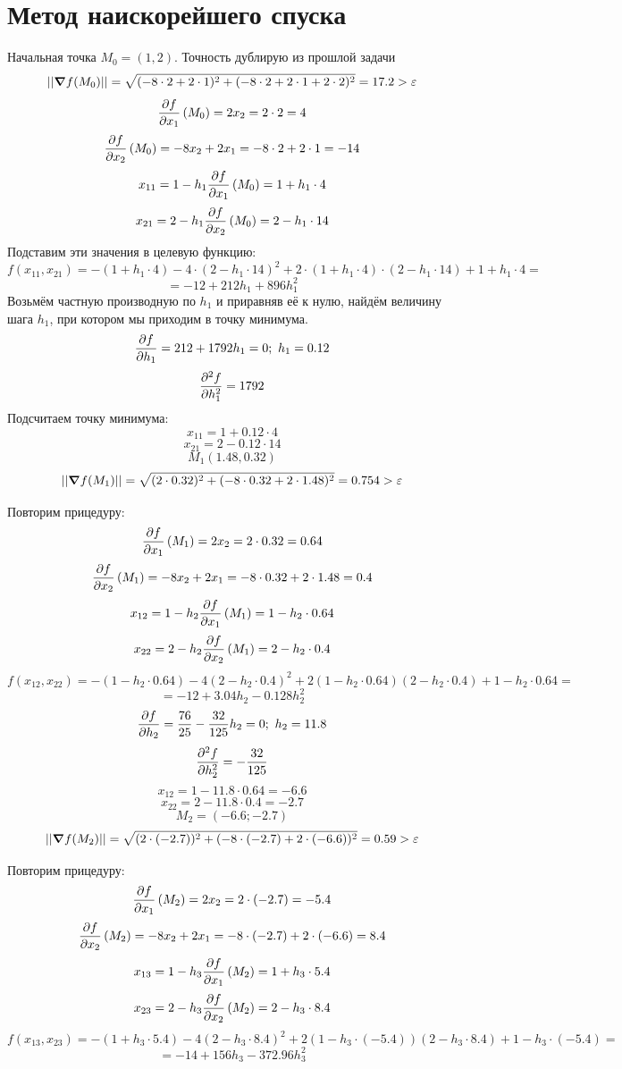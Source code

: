 \documentclass{article}
\begin{document}
\section*{Метод наискорейшего спуска}
Начальная точка $M_0 = (1, 2)$. Точность дублирую из прошлой задачи
\[||\grad f(M_0)|| = \sqrt{(-8\cdot 2+ 2\cdot 1)^2 + (-8\cdot 2+ 2\cdot 1 + 2\cdot 2)^2} = 17.2> \varepsilon\]
\[\pdv{f}{x_1} \left(M_0\right) = 2x_2 = 2\cdot 2 = 4\]
\[\pdv{f}{x_2} \left(M_0\right) = -8x_2+2x_1 = -8\cdot 2+ 2\cdot 1 = -14\]
\[x_{11} = 1 - h_1 \pdv{f}{x_1} \left(M_0\right) = 1 + h_1\cdot 4 \]
\[x_{21} = 2 - h_1 \pdv{f}{x_2} \left(M_0\right) = 2 - h_1\cdot 14 \]
Подставим эти значения в целевую функцию:
\[f(x_{11}, x_{21}) = -(1 + h_1\cdot 4) - 4\cdot (2 - h_1\cdot 14)^2 + 2\cdot (1 + h_1\cdot 4)\cdot (2 - h_1\cdot 14) +  1 + h_1\cdot 4 =\]
\[= -12 +212h_1+896h_1^2\]
Возьмём частную производную по $h_1$ и приравняв её к нулю, найдём величину шага $h_1$, при котором мы приходим в точку минимума.
\[\pdv{f}{h_1} = 212+1792h_1 = 0;\ h_1 = 0.12\]
\[\pdv{^2f}{h_1^2} = 1792\]
Подсчитаем точку минимума:
\[x_{11} = 1 + 0.12\cdot 4\]
\[x_{21} = 2 - 0.12\cdot 14\]
\[M_1(1.48, 0.32)\]
\[||\grad f(M_1)|| = \sqrt{(2\cdot 0.32)^2 + (-8\cdot 0.32 + 2\cdot 1.48)^2} = 0.754> \varepsilon\]

Повторим прицедуру:
\[\pdv{f}{x_1} \left(M_1\right) = 2x_2 = 2\cdot 0.32 = 0.64\]
\[\pdv{f}{x_2} \left(M_1\right) = -8x_2+2x_1 = -8\cdot 0.32+ 2\cdot 1.48 = 0.4\]
\[x_{12} = 1 - h_2 \pdv{f}{x_1} \left(M_1\right) = 1 - h_2\cdot 0.64 \]
\[x_{22} = 2 - h_2 \pdv{f}{x_2} \left(M_1\right) = 2 - h_2\cdot 0.4 \]
\[f(x_{12}, x_{22}) = -(1 - h_2\cdot 0.64)-4(2 - h_2\cdot 0.4)^2+2(1 - h_2\cdot 0.64)(2 - h_2\cdot 0.4)+1 - h_2\cdot 0.64 = \]
\[ = -12 + 3.04h_2-0.128h_2^2\]
\[\pdv{f}{h_2} = \frac{76}{25} - \frac{32}{125}h_2 = 0;\ h_2 = 11.8\]
\[\pdv{^2f}{h_2^2} = -\frac{32}{125}\]
\[x_{12} = 1 - 11.8\cdot 0.64  = -6.6\]
\[x_{22} = 2 - 11.8\cdot 0.4 = -2.7\]
\[M_2 = (-6.6; -2.7)\]
\[||\grad f(M_2)|| = \sqrt{(2\cdot (-2.7))^2 + (-8\cdot (-2.7) + 2\cdot (-6.6))^2} = 0.59> \varepsilon\]

Повторим прицедуру:
\[\pdv{f}{x_1} \left(M_2\right) = 2x_2 = 2\cdot (-2.7) = -5.4\]
\[\pdv{f}{x_2} \left(M_2\right) = -8x_2+2x_1 = -8\cdot (-2.7)+ 2\cdot (-6.6) = 8.4\]
\[x_{13} = 1 - h_3 \pdv{f}{x_1} \left(M_2\right) = 1 + h_3\cdot 5.4 \]
\[x_{23} = 2 - h_3 \pdv{f}{x_2} \left(M_2\right) = 2 - h_3\cdot 8.4 \]
\[f(x_{13}, x_{23}) = -(1 + h_3\cdot 5.4 )-4(2 - h_3\cdot 8.4)^2+2(1 - h_3\cdot (-5.4))(2 - h_3\cdot 8.4)+1 - h_3\cdot (-5.4) = \]
\[ = -14+156h_3-372.96h_3^2\]
\end{document}
